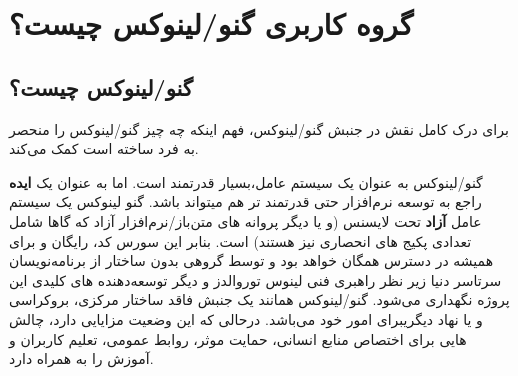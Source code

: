 \section{گروه کاربری گنو/لینوکس چیست؟}

\subsection{گنو/لینوکس چیست؟}

برای درک کامل نقش
در جنبش گنو/لینوکس، فهم اینکه چه چیز گنو/لینوکس را منحصر به فرد ساخته است کمک می‌کند.

گنو/لینوکس به عنوان یک سیستم عامل،بسیار قدرتمند است. اما به عنوان یک
{\bfseries ایده}
راجع به توسعه نرم‌افزار حتی قدرتمند تر هم میتواند باشد. گنو لینوکس یک سیستم عامل
{\bfseries آزاد}
تحت لایسنس
(و یا دیگر پروانه های متن‌باز/نرم‌افزار آزاد که گاها شامل تعدادی پکیج های انحصاری نیز هستند) است. بنابر این سورس کد، رایگان و برای همیشه در دسترس همگان خواهد بود و توسط گروهی بدون ساختار از برنامه‌نویسان سرتاسر دنیا زیر نظر راهبری فنی لینوس توروالدز و دیگر توسعه‌دهنده های کلیدی این پروژه نگهداری می‌شود. گنو/لینوکس همانند یک جنبش فاقد ساختار مرکزی، بروکراسی و یا نهاد دیگریبرای امور خود می‌باشد. درحالی که این وضعیت مزایایی دارد، چالش هایی برای اختصاص منابع انسانی، حمایت موثر، روابط عمومی، تعلیم کاربران و آموزش را به همراه دارد.

